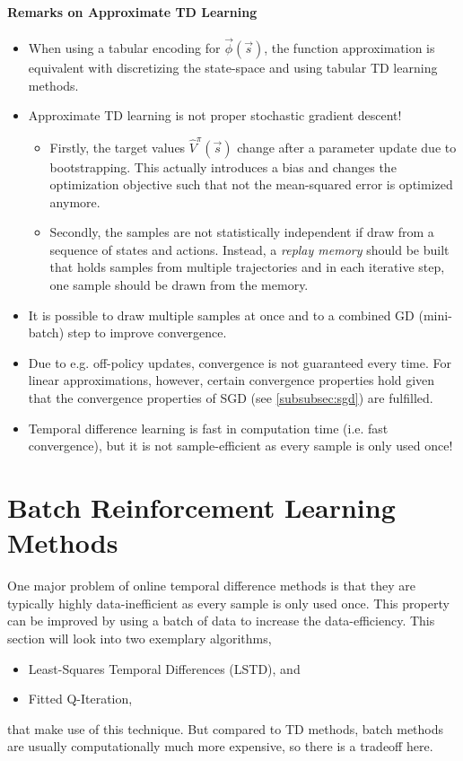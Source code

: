 		\paragraph{Remarks on Approximate TD Learning}
			\begin{itemize}
				\item When using a tabular encoding for \( \vec{\phi}(\vec{s}) \), the function approximation is equivalent with discretizing the state-space and using tabular TD learning methods.
				\item Approximate TD learning is not proper stochastic gradient descent!
					\begin{itemize}
						\item Firstly, the target values \( \hat{V}^\pi(\vec{s}) \) change after a parameter update due to bootstrapping. This actually introduces a bias and changes the optimization objective such that not the mean-squared error is optimized anymore.
						\item Secondly, the samples are not statistically independent if draw from a sequence of states and actions. Instead, a \emph{replay memory} should be built that holds samples from multiple trajectories and in each iterative step, one sample should be drawn from the memory.
					\end{itemize}
				\item It is possible to draw multiple samples at once and to a combined GD (mini-batch) step to improve convergence.
				\item Due to e.g. off-policy updates, convergence is not guaranteed every time. For linear approximations, however, certain convergence properties hold given that the convergence properties of SGD (see \autoref{subsubsec:sgd}) are fulfilled.
				\item Temporal difference learning is fast in computation time (i.e. fast convergence), but it is not sample-efficient as every sample is only used once!
			\end{itemize}

	\section{Batch Reinforcement Learning Methods}
		One major problem of online temporal difference methods is that they are typically highly data-inefficient as every sample is only used once. This property can be improved by using a batch of data to increase the data-efficiency. This section will look into two exemplary algorithms,
		\begin{itemize}
			\item Least-Squares Temporal Differences (LSTD), and
			\item Fitted Q-Iteration,
		\end{itemize}
		that make use of this technique. But compared to TD methods, batch methods are usually computationally much more expensive, so there is a tradeoff here.


